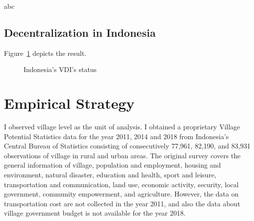 \documentclass[letterpaper,12pt,leqno]{article}
\begin{document}
abc

\subsection{Decentralization in Indonesia}

Figure~\ref{f:graph1} depicts the result.


\begin{figure}[t]
\hfill
{}
\caption{Indonesia's VDI's status}
\label{f:graph1}\end{figure}

\section{Empirical Strategy}\label{s:strategy}

I observed village level as the unit of analysis. I obtained a proprietary Village Potential Statistics data for the year 2011, 2014 and 2018 from Indonesia's Central Bureau of Statistics consisting of consecutively 77,961, 82,190, and 83,931 observations of village in rural and urban areas. The original survey covers the general information of village, population and employment, housing and environment, natural disaster, education and health, sport and leisure, transportation and communication, land use, economic activity, security, local government, community empowerment, and agriculture. However, the data on transportation cost are not collected in the year 2011, and also the data about village government budget is not available for the year 2018. 
\end{document}
